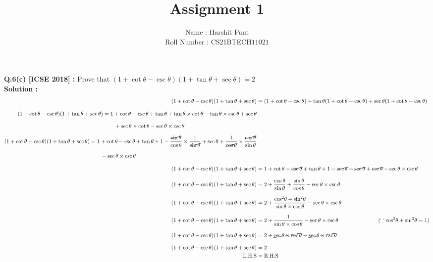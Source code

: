 \documentclass[a4paper,12pts]{article}
\title{\textbf{\Huge{Assignment 1}}}
\author{\Large{Name : Harshit Pant}\\\Large{Roll Number : CS21BTECH$11021$}}
\date{}
\begin{document}
\maketitle
\setlength{\parindent}{0cm}
\textbf{Q.6(c) [ICSE 2018] :}
Prove that $(1 +\cot\theta -\csc\theta)(1 + \tan\theta +\sec\theta)=2$\\

\textbf{Solution : }
\begin{align*}
(1+ \cot\theta -\csc\theta)(1+\tan\theta+\sec\theta)&=(1+\cot\theta-\csc\theta)+\tan\theta(1+\cot\theta-\csc\theta)+\sec\theta(1+\cot\theta-\csc\theta)\\[.1in]
\begin{split}
(1+ \cot\theta -\csc\theta)(1+\tan\theta+\sec\theta)&=1+\cot\theta-\csc\theta+\tan\theta+\tan\theta\times\cot\theta-\tan\theta\times\csc\theta+\sec\theta\\[.1in]
&\qquad
+\sec\theta\times\cot\theta-\sec\theta\times\csc\theta
\end{split}\\[.1in]
\begin{split}
(1+ \cot\theta -\csc\theta)(1+\tan\theta+\sec\theta)&=\displaystyle{1+\cot\theta-\csc\theta+\tan\theta+1-\frac{\cancel{\sin\theta}}{\cos\theta}\times\frac{1}{\cancel{\sin\theta}}+\sec\theta+\frac{1}{\cancel{\cos\theta}}\times\frac{\cancel{\cos\theta}}{\sin\theta}}\\[.1in]
&\qquad
-\sec\theta\times\csc\theta
\end{split}
\\[.1in]
(1+ \cot\theta -\csc\theta)(1+\tan\theta+\sec\theta)&=1+\cot\theta-\cancel{\csc\theta}+\tan\theta+1-\cancel{\sec\theta}+\cancel{\sec\theta}+\cancel{\csc\theta}-\sec\theta\times\csc\theta\\[.1in]
(1+ \cot\theta -\csc\theta)(1+\tan\theta+\sec\theta)&=2+\dfrac{\cos\theta}{\sin\theta}+\dfrac{\sin\theta}{\cos\theta}-\sec\theta\times\csc\theta\\[.1in]
(1+ \cot\theta -\csc\theta)(1+\tan\theta+\sec\theta)&=\displaystyle{2+\dfrac{{\cos}^2\theta+{\sin}^2\theta}{\sin\theta\times\cos\theta}-\sec\theta\times\csc\theta}\\[.1in]
(1+ \cot\theta -\csc\theta)(1+\tan\theta+\sec\theta)&=\displaystyle{2+\frac{1}{\sin\theta\times\cos\theta}-\sec\theta\times\csc\theta}\hspace{1in}
(\because{\cos}^2\theta+{\sin}^2\theta=1)\\[.1in]
(1+ \cot\theta -\csc\theta)(1+\tan\theta+\sec\theta)&=\displaystyle{2+\cancel{\csc\theta\times\sec\theta}-\cancel{\sec\theta\times\csc\theta}}\\[.1in]
(1+ \cot\theta -\csc\theta)(1+\tan\theta+\sec\theta)&=2\\
\text{L.H.S}&=\text{R.H.S}
\end{align*}
\end{document}
